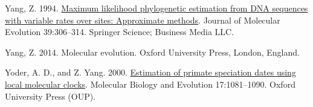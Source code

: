 \documentclass[fleqn,10pt,lineno]{wlpeerj} %
\newlength{\cslhangindent}
\newenvironment{CSLReferences}[2] %
 {\begin{list}{}{%
  \setlength{\itemindent}{0pt}
  \setlength{\leftmargin}{0pt}
  \setlength{\parsep}{0pt}
  \ifodd #1
   \setlength{\leftmargin}{\cslhangindent}
   \setlength{\itemindent}{-1\cslhangindent}
  \fi
  \setlength{\itemsep}{#2\baselineskip}}}
 {\end{list}}
\begin{document}
\begin{CSLReferences}{1}{0}
Yang, Z. 1994. \href{https://doi.org/10.1007/bf00160154}{Maximum likelihood phylogenetic estimation from DNA sequences with variable rates over sites: Approximate methods}. Journal of Molecular Evolution 39:306--314. Springer Science; Business Media LLC.

Yang, Z. 2014. Molecular evolution. Oxford University Press, London, England.

Yoder, A. D., and Z. Yang. 2000. \href{https://doi.org/10.1093/oxfordjournals.molbev.a026389}{Estimation of primate speciation dates using local molecular clocks}. Molecular Biology and Evolution 17:1081--1090. Oxford University Press (OUP).

\end{CSLReferences}
\end{document}
